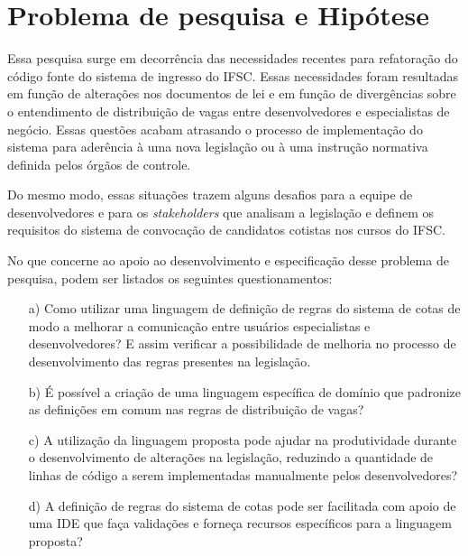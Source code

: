\section{Problema de pesquisa e Hipótese}
\label{problema}

Essa pesquisa surge em decorrência das necessidades recentes para refatoração do código fonte do sistema de ingresso do \gls{IFSC}. Essas necessidades foram resultadas em função de alterações nos documentos de lei e em função de  divergências sobre o entendimento de distribuição de vagas entre desenvolvedores e especialistas de negócio. Essas questões acabam atrasando o processo de implementação do sistema para aderência à uma nova legislação ou à uma instrução normativa definida pelos órgãos de controle.

Do mesmo modo, essas situações trazem alguns desafios para a equipe de desenvolvedores e para os \textit{stakeholders} que analisam a legislação e definem os requisitos do sistema de convocação de candidatos cotistas nos cursos do \gls{IFSC}. 

No que concerne ao apoio ao desenvolvimento e especificação desse problema de pesquisa, podem ser listados os seguintes questionamentos:

\begin{enumerate}
    \item[a)] Como utilizar uma linguagem de definição de regras do sistema de cotas de modo a melhorar a comunicação entre usuários especialistas e desenvolvedores? E assim verificar a possibilidade de melhoria no processo de desenvolvimento das regras presentes na legislação.
    
    \item[b)] É possível a criação de uma linguagem específica de domínio que padronize as definições em comum nas regras de distribuição de vagas?
    
    \item[c)] A utilização da linguagem proposta pode ajudar na produtividade durante o desenvolvimento de alterações na legislação, reduzindo a quantidade de linhas de código a serem implementadas manualmente pelos desenvolvedores?
    
    \item[d)] A definição de regras do sistema de cotas pode ser facilitada com apoio de uma \gls{IDE} que faça validações e forneça recursos específicos para a linguagem proposta?
    

    
\end{enumerate}